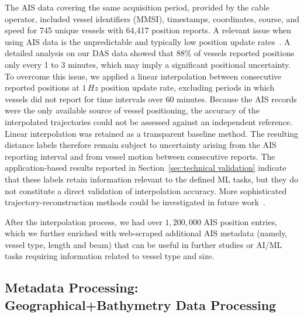 \documentclass[11pt]{article}
\begin{document}
The AIS data covering the same acquisition period, provided by the cable operator, included vessel identifiers (MMSI), timestamps, coordinates, course, and speed for 745 unique vessels with 64,417 position reports. A relevant issue when using AIS data is the unpredictable and typically low position update rates~\cite{emmens2021promisesAIS}. A detailed analysis on our DAS data showed that $88\%$ of vessels reported positions only every 1 to 3 minutes, which may imply a significant positional uncertainty. To overcome this issue, we applied a linear interpolation between consecutive reported positions at $1\,Hz$ position update rate, excluding periods in which vessels did not report for time intervals over 60 minutes. Because the AIS records were the only available source of vessel positioning, the accuracy of the interpolated trajectories could not be assessed against an independent reference. Linear interpolation was retained as a transparent baseline method. The resulting distance labels therefore remain subject to uncertainty arising from the AIS reporting interval and from vessel motion between consecutive reports. The application-based results reported in Section~\ref{sec:technical validation} indicate that these labels retain information relevant to the defined ML tasks, but they do not constitute a direct validation of interpolation accuracy. More sophisticated trajectory-reconstruction methods could be investigated in future work~\cite{guo2021improved}.


After the interpolation process, we had over $1,200,000$ AIS position entries, which we further enriched with web-scraped additional AIS metadata (namely, vessel type, length and beam) that can be useful in further studies or AI/ML tasks requiring information related to vessel type and size.


\subsection{Metadata Processing: Geographical+Bathymetry Data Processing}
\label{sec:geospatial-tagging}
\end{document}
